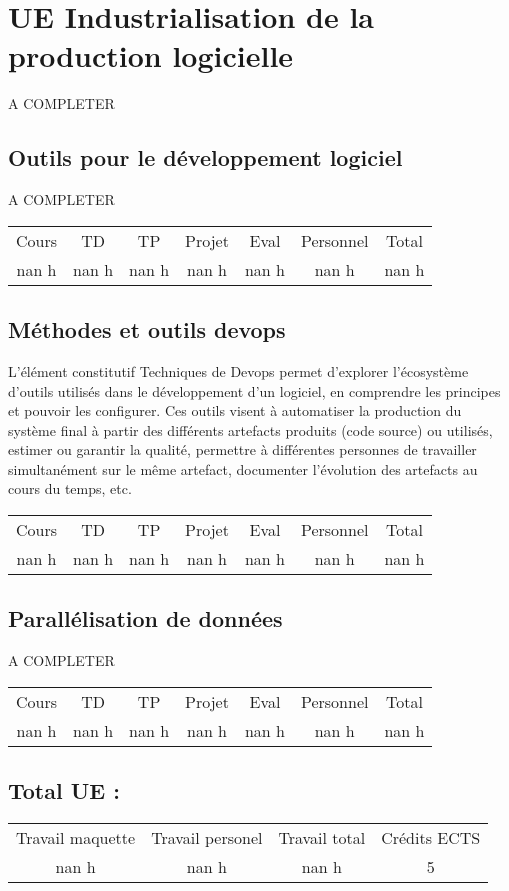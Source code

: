 \section{UE Industrialisation de la production logicielle}%
\label{sec:UEIndustrialisationdelaproductionlogicielle}%
A COMPLETER%
\subsection{Outils pour le développement logiciel }%
\label{subsec:Outilspourledveloppementlogiciel}%

%
A COMPLETER%
\begin{longtable}{c c c c c c c}%
\hline%
Cours&TD&TP&Projet&Eval&Personnel&Total\\%
nan h&nan h&nan h&nan h&nan h&nan h&nan h\\%
\hline%
\end{longtable}%
\subsection{Méthodes et outils devops}%
\label{subsec:Mthodesetoutilsdevops}%

%
L'élément constitutif Techniques de Devops permet d’explorer l’écosystème d’outils utilisés dans le développement d'un logiciel, en comprendre les principes et pouvoir les configurer. Ces outils visent à automatiser la production du système final à partir des différents artefacts produits (code source) ou utilisés, estimer ou garantir la qualité, permettre à différentes personnes de travailler simultanément sur le même artefact, documenter l'évolution des artefacts au cours du temps, etc.%
\begin{longtable}{c c c c c c c}%
\hline%
Cours&TD&TP&Projet&Eval&Personnel&Total\\%
nan h&nan h&nan h&nan h&nan h&nan h&nan h\\%
\hline%
\end{longtable}%
\subsection{Parallélisation de données}%
\label{subsec:Paralllisationdedonnes}%

%
A COMPLETER%
\begin{longtable}{c c c c c c c}%
\hline%
Cours&TD&TP&Projet&Eval&Personnel&Total\\%
nan h&nan h&nan h&nan h&nan h&nan h&nan h\\%
\hline%
\end{longtable}%
\subsection{Total UE :}%
\label{subsec:TotalUE}%

%
\begin{longtable}{c c c c}%
\hline%
Travail maquette&Travail personel&Travail total&Crédits ECTS\\%
nan h&nan h&nan h&5\\%
\hline%
\end{longtable}
